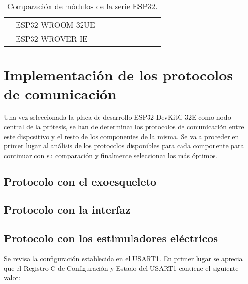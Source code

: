 \begin{landscape}
\begin{table}[]
\begin{tabular}{|c|c|c|c|c|c|c|c|}
                                                               & \multicolumn{1}{l|}{ESP32-WROOM-32UE} & -                   & -                   & -                   & -                                                                         & -                                                                                           & -                                                          \\ \cline{2-8} 
                                                               & \multicolumn{1}{l|}{ESP32-WROVER-IE}  & -                   & -                   & -                   & -                                                                         & -                                                                                           & -                                                          \\ \hline
\end{tabular}
\caption{Comparación de módulos de la serie ESP32\cite{modulos_esp32}.}
\label{tabla:modulos_esp32_2}
\end{table}

\end{landscape}



\section{Implementación de los protocolos de comunicación}
Una vez seleccionada la placa de desarrollo ESP32-DevKitC-32E como nodo central de la prótesis, se han de determinar los protocolos de comunicación entre este dispositivo y el resto de los componentes de la misma. Se va a proceder en primer lugar al análisis de los protocolos disponibles para cada componente para continuar con su comparación y finalmente seleccionar los más óptimos.

\subsection{Protocolo con el exoesqueleto}
\subsection{Protocolo con la interfaz}
\subsection{Protocolo con los estimuladores eléctricos}

Se revisa la configuración establecida en el USART1. En primer lugar se aprecia que el Registro C de Configuración y Estado del USART1 contiene el siguiente valor:\\

